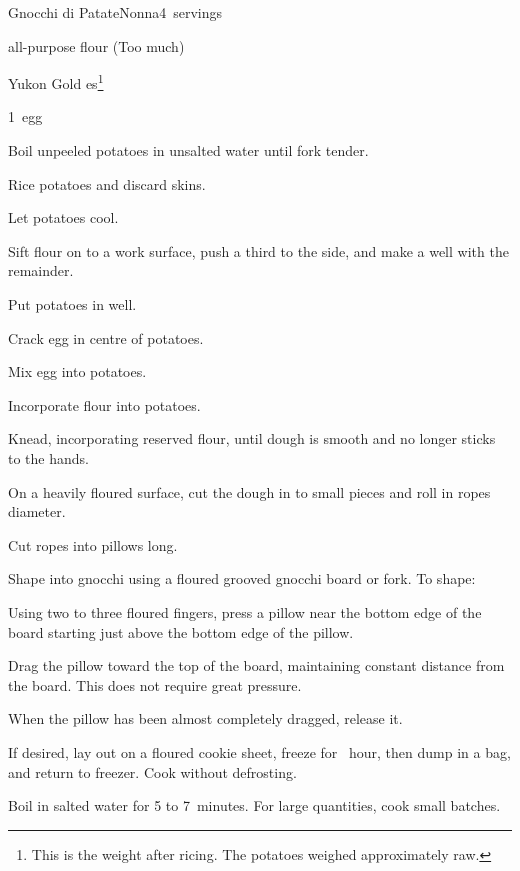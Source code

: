 \begin{recipe}{Gnocchi di Patate\FIXME}{Nonna}{4~servings}

\begin{ingredients}
\item {} all-purpose flour\FIXME{} (Too much)
\item {} Yukon Gold es\footnote{This is the weight after ricing. The potatoes weighed approximately  raw.}
\item 1~egg
\end{ingredients}

\begin{directions}
\item Boil unpeeled potatoes in unsalted water until fork tender.
\item Rice potatoes and discard skins.
\item Let potatoes cool.
\item Sift flour on to a work surface, push a third to the side, and make a well with the remainder.
\item Put potatoes in well.
\item Crack egg in centre of potatoes.
\item Mix egg into potatoes.
\item Incorporate flour into potatoes.
\item Knead, incorporating reserved flour, until dough is smooth and no longer sticks to the hands.
\item On a heavily floured surface, cut the dough in to small pieces and roll in ropes \inch{\threequarter} diameter.
\item Cut ropes into pillows  long.
\item Shape into gnocchi using a floured grooved gnocchi board or fork. To shape:\par
\begin{enumerate*}
\item Using two to three floured fingers, press a pillow near the bottom edge of the board starting just above the bottom edge of the pillow.
\item Drag the pillow toward the top of the board, maintaining constant distance from the board. This does not require great pressure.
\item When the pillow has been almost completely dragged, release it.
\end{enumerate*}
\item If desired, lay out on a floured cookie sheet, freeze for \half{}~hour, then dump in a bag, and return to freezer. Cook without defrosting.
\item Boil in salted water for 5 to 7~minutes. For large quantities, cook small batches.
\end{directions}

\end{recipe}
